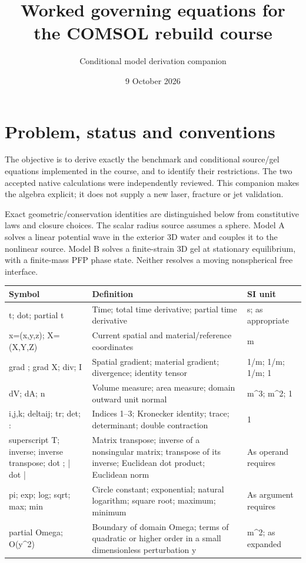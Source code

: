 \documentclass[11pt]{article}
\title{Worked governing equations for the COMSOL rebuild course}
\author{Conditional model derivation companion}
\date{9 October 2026}
\begin{document}
\maketitle\tableofcontents

\section{Problem, status and conventions}\label{sec:scope}

The objective is to derive exactly the benchmark and conditional source/gel equations implemented in the course, and to identify their restrictions. The two accepted native calculations were independently reviewed. This companion makes the algebra explicit; it does not supply a new laser, fracture or jet validation.

Exact geometric/conservation identities are distinguished below from constitutive laws and closure choices. The scalar radius source assumes a sphere. Model A solves a linear potential wave in the exterior 3D water and couples it to the nonlinear source. Model B solves a finite-strain 3D gel at stationary equilibrium, with a finite-mass PFP phase state. Neither resolves a moving nonspherical free interface.

\begin{longtable}{p{.18\linewidth}p{.60\linewidth}p{.15\linewidth}}Symbol & Definition & SI unit\\\hline

t; dot; partial t & Time; total time derivative; partial time derivative & s; as appropriate\\

x=(x,y,z); X=(X,Y,Z) & Current spatial and material/reference coordinates & m\\

grad ; grad X; div; I & Spatial gradient; material gradient; divergence; identity tensor & 1/m; 1/m; 1/m; 1\\

dV; dA; n & Volume measure; area measure; domain outward unit normal & m\textasciicircum{}3; m\textasciicircum{}2; 1\\

i,j,k; deltaij; tr; det; : & Indices 1--3; Kronecker identity; trace; determinant; double contraction & 1\\

superscript T; inverse; inverse transpose;  dot ; | dot | & Matrix transpose; inverse of a nonsingular matrix; transpose of its inverse; Euclidean dot product; Euclidean norm & As operand requires\\

pi; exp; log; sqrt; max; min & Circle constant; exponential; natural logarithm; square root; maximum; minimum & As argument requires\\

partial Omega; O(y\textasciicircum{}2) & Boundary of domain Omega; terms of quadratic or higher order in a small dimensionless perturbation y & m\textasciicircum{}2; as expanded\\

\end{longtable}
\end{document}
